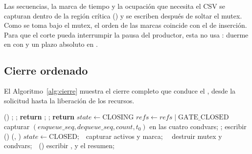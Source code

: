Las secuencias, la marca de tiempo y la ocupación que necesita el CSV se
capturan dentro de la región crítica () y se
escriben después de soltar el mutex. Como  se toma
bajo el mutex, el orden de las marcas coincide con el de inserción. Para
que el corte pueda interrumpir la pausa del productor, esta no usa
: duerme en  con
 y un plazo absoluto en
.

\subsection{Cierre ordenado}

El Algoritmo~\ref{alg:cierre} muestra el cierre completo que conduce el
, desde la solicitud hasta la liberación de los recursos.

\begin{algorithm}[H]
\caption{Cierre ()}
\label{alg:cierre}
\footnotesize
\begin{algorithmic}[1]
\STATE {} 
\STATE {}()
  \STATE {}; ; \textbf{return} 
\ENDIF
{}
  \STATE {}; ; \textbf{return}  
\ENDIF
\STATE $\mathit{state} \gets \mathrm{CLOSING}$ 
\STATE $\mathit{refs} \gets \mathit{refs} \mathbin{|} \mathrm{GATE\_CLOSED}$
\STATE capturar $(\mathit{enqueue\_seq}, \mathit{dequeue\_seq}, \mathit{count}, t_0)$
\STATE {} en las cuatro condvars; ; escribir 
\STATE {}()
  \STATE {}(, )
\ENDWHILE
\STATE $\mathit{state} \gets \mathrm{CLOSED}$;\ \ capturar activos y marca;\ \ 
\STATE destruir mutex y condvars;\ \ ()
\STATE escribir ,  y el resumen;\ \ 
\end{algorithmic}
\end{algorithm}

